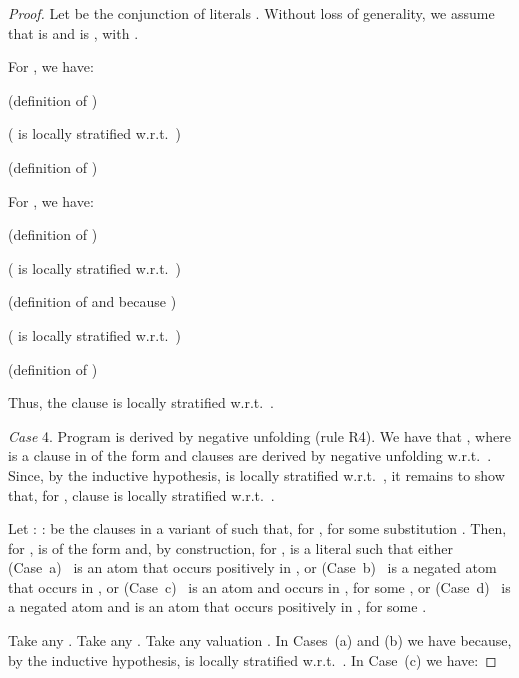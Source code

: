 \documentclass[english]{tlp}
\begin{document}
\begin{proof}
Let  be the conjunction of 
literals . Without loss of generality, we assume
that  is  and  is
, with .

\noindent For , we have:

\smallskip

\makebox[1.75cm][l]{} \makebox[3cm][l]{} (definition of )

\hspace*{1.75cm} \makebox[3cm][l]{} (
is locally stratified w.r.t.~)

\hspace*{1.75cm} \makebox[3cm][l]{}
(definition of )

\smallskip

\noindent \noindent For , we have:


\smallskip

\makebox[1.75cm][l]{} \makebox[3cm][l]{} (definition of )

\hspace*{1.75cm} \makebox[3cm][l]{} ( is
locally stratified w.r.t.~)

\hspace*{1.75cm} \makebox[3cm][l]{} (definition of
 and because )

\hspace*{1.75cm} \makebox[3cm][l]{}
( is locally stratified w.r.t.~)

\hspace*{1.75cm} \makebox[3cm][l]{}
(definition of )

\smallskip

\noindent Thus, the clause  is locally stratified
w.r.t.~.

\medskip

\noindent \emph{Case} 4. Program  is derived by
negative unfolding (rule R4). We have that ,
where  is a clause in  of the form  and clauses  are derived by negative unfolding  w.r.t.~. Since, by the inductive hypothesis,
 is locally stratified w.r.t.~,
it remains to show that, for , clause  is locally stratified w.r.t.~.

Let :   :
 be the clauses in a variant of 
such that, for ,  for
some substitution . Then,  for ,  is of the form  and, by construction, for ,  is a
literal such that either (Case~a)~ is an atom that occurs
positively in , or (Case~b)~ is a negated
atom that occurs in , or (Case~c)~ is an atom
 and  occurs in , for some , or (Case~d)~ is a negated atom 
and  is an atom that occurs positively in , for
some .

Take any .
Take any . Take any valuation . In Cases~(a) and (b) we have
 because, by the inductive
hypothesis,  is locally stratified w.r.t.~. 
In Case~(c) we have:


\end{proof}
\end{document}
